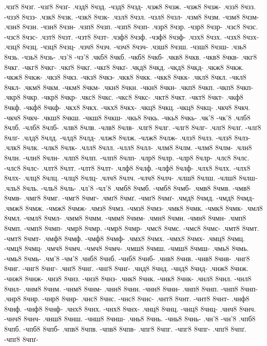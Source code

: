 {.чзґ8 8чзґ. -чзґ8 8чзґ-
.чзд8 8чзд. -чзд8 8чзд-
.чзж8 8чзж. -чзж8 8чзж-
.чзз8 8чзз. -чзз8 8чзз-
.чзк8 8чзк. -чзк8 8чзк-
.чзл8 8чзл. -чзл8 8чзл-
.чзм8 8чзм. -чзм8 8чзм-
.чзн8 8чзн. -чзн8 8чзн-
.чзп8 8чзп. -чзп8 8чзп-
.чзр8 8чзр. -чзр8 8чзр-
.чзс8 8чзс. -чзс8 8чзс-
.чзт8 8чзт. -чзт8 8чзт-
.чзф8 8чзф. -чзф8 8чзф-
.чзх8 8чзх. -чзх8 8чзх-
.чзц8 8чзц. -чзц8 8чзц-
.чзч8 8чзч. -чзч8 8чзч-
.чзш8 8чзш. -чзш8 8чзш-
.чзь8 8чзь. -чзь8 8чзь-
.чз'8 -чз'8
.чкб8 8чкб. -чкб8 8чкб-
.чкв8 8чкв. -чкв8 8чкв-
.чкг8 8чкг. -чкг8 8чкг-
.чкґ8 8чкґ. -чкґ8 8чкґ-
.чкд8 8чкд. -чкд8 8чкд-
.чкж8 8чкж. -чкж8 8чкж-
.чкз8 8чкз. -чкз8 8чкз-
.чкк8 8чкк. -чкк8 8чкк-
.чкл8 8чкл. -чкл8 8чкл-
.чкм8 8чкм. -чкм8 8чкм-
.чкн8 8чкн. -чкн8 8чкн-
.чкп8 8чкп. -чкп8 8чкп-
.чкр8 8чкр. -чкр8 8чкр-
.чкс8 8чкс. -чкс8 8чкс-
.чкт8 8чкт. -чкт8 8чкт-
.чкф8 8чкф. -чкф8 8чкф-
.чкх8 8чкх. -чкх8 8чкх-
.чкц8 8чкц. -чкц8 8чкц-
.чкч8 8чкч. -чкч8 8чкч-
.чкш8 8чкш. -чкш8 8чкш-
.чкь8 8чкь. -чкь8 8чкь-
.чк'8 -чк'8
.члб8 8члб. -члб8 8члб-
.члв8 8члв. -члв8 8члв-
.члг8 8члг. -члг8 8члг-
.члґ8 8члґ. -члґ8 8члґ-
.члд8 8члд. -члд8 8члд-
.члж8 8члж. -члж8 8члж-
.члз8 8члз. -члз8 8члз-
.члк8 8члк. -члк8 8члк-
.члл8 8члл. -члл8 8члл-
.члм8 8члм. -члм8 8члм-
.члн8 8члн. -члн8 8члн-
.члп8 8члп. -члп8 8члп-
.члр8 8члр. -члр8 8члр-
.члс8 8члс. -члс8 8члс-
.члт8 8члт. -члт8 8члт-
.члф8 8члф. -члф8 8члф-
.члх8 8члх. -члх8 8члх-
.члц8 8члц. -члц8 8члц-
.члч8 8члч. -члч8 8члч-
.члш8 8члш. -члш8 8члш-
.чль8 8чль. -чль8 8чль-
.чл'8 -чл'8
.чмб8 8чмб. -чмб8 8чмб-
.чмв8 8чмв. -чмв8 8чмв-
.чмг8 8чмг. -чмг8 8чмг-
.чмґ8 8чмґ. -чмґ8 8чмґ-
.чмд8 8чмд. -чмд8 8чмд-
.чмж8 8чмж. -чмж8 8чмж-
.чмз8 8чмз. -чмз8 8чмз-
.чмк8 8чмк. -чмк8 8чмк-
.чмл8 8чмл. -чмл8 8чмл-
.чмм8 8чмм. -чмм8 8чмм-
.чмн8 8чмн. -чмн8 8чмн-
.чмп8 8чмп. -чмп8 8чмп-
.чмр8 8чмр. -чмр8 8чмр-
.чмс8 8чмс. -чмс8 8чмс-
.чмт8 8чмт. -чмт8 8чмт-
.чмф8 8чмф. -чмф8 8чмф-
.чмх8 8чмх. -чмх8 8чмх-
.чмц8 8чмц. -чмц8 8чмц-
.чмч8 8чмч. -чмч8 8чмч-
.чмш8 8чмш. -чмш8 8чмш-
.чмь8 8чмь. -чмь8 8чмь-
.чм'8 -чм'8
.чнб8 8чнб. -чнб8 8чнб-
.чнв8 8чнв. -чнв8 8чнв-
.чнг8 8чнг. -чнг8 8чнг-
.чнґ8 8чнґ. -чнґ8 8чнґ-
.чнд8 8чнд. -чнд8 8чнд-
.чнж8 8чнж. -чнж8 8чнж-
.чнз8 8чнз. -чнз8 8чнз-
.чнк8 8чнк. -чнк8 8чнк-
.чнл8 8чнл. -чнл8 8чнл-
.чнм8 8чнм. -чнм8 8чнм-
.чнн8 8чнн. -чнн8 8чнн-
.чнп8 8чнп. -чнп8 8чнп-
.чнр8 8чнр. -чнр8 8чнр-
.чнс8 8чнс. -чнс8 8чнс-
.чнт8 8чнт. -чнт8 8чнт-
.чнф8 8чнф. -чнф8 8чнф-
.чнх8 8чнх. -чнх8 8чнх-
.чнц8 8чнц. -чнц8 8чнц-
.чнч8 8чнч. -чнч8 8чнч-
.чнш8 8чнш. -чнш8 8чнш-
.чнь8 8чнь. -чнь8 8чнь-
.чн'8 -чн'8
.чпб8 8чпб. -чпб8 8чпб-
.чпв8 8чпв. -чпв8 8чпв-
.чпг8 8чпг. -чпг8 8чпг-
.чпґ8 8чпґ. -чпґ8 8чпґ-
}
